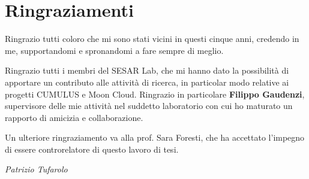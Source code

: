 \chapter*{Ringraziamenti}

Ringrazio tutti coloro che mi sono stati vicini in questi cinque anni, credendo in me, supportandomi e spronandomi a fare sempre di meglio.

Ringrazio tutti i membri del SESAR Lab, che mi hanno dato la possibilità di apportare un contributo alle attività di ricerca, in particolar modo relative ai progetti CUMULUS e Moon Cloud. Ringrazio in particolare \textbf{Filippo Gaudenzi}, supervisore delle mie attività nel suddetto laboratorio con cui ho maturato un rapporto di amicizia e collaborazione.

Un ulteriore ringraziamento va alla prof. Sara Foresti, che ha accettato l'impegno di essere controrelatore di questo lavoro di tesi.

\begin{flushright}\textit{Patrizio Tufarolo}\end{flushright}
